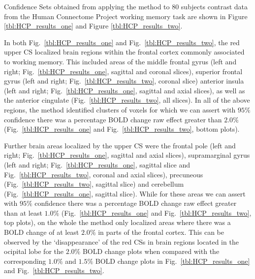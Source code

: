 Confidence Sets obtained from applying the method to 80 subjects contrast data from the Human Connectome Project working memory task are shown in Figure \ref{tbl:HCP_results_one} and Figure \ref{tbl:HCP_results_two}.

In both Fig.\ \ref{tbl:HCP_results_one} and Fig.\ \ref{tbl:HCP_results_two}, the red upper CS localized brain regions within the frontal cortex commonly associated to working memory. This included areas of the middle frontal gyrus (left and right; Fig.\ \ref{tbl:HCP_results_one}, sagittal and coronal slices), superior frontal gyrus (left and right; Fig.\ \ref{tbl:HCP_results_two}, coronal slice) anterior insula (left and right; Fig.\ \ref{tbl:HCP_results_one}, sagittal and axial slices), as well as the anterior cingulate (Fig.\ \ref{tbl:HCP_results_two}, all slices). In all of the above regions, the method identified clusters of voxels for which we can assert with $95\%$ confidence there was a percentage BOLD change raw effect greater than $2.0\%$ (Fig.\ \ref{tbl:HCP_results_one} and Fig.\ \ref{tbl:HCP_results_two}, bottom plots). 

Further brain areas localized by the upper CS were the frontal pole (left and right; Fig.\ \ref{tbl:HCP_results_one}, sagittal and axial slices), supramarginal gyrus (left and right; Fig.\ \ref{tbl:HCP_results_one}, sagittal slice and Fig.\ \ref{tbl:HCP_results_two}, coronal and axial slices), precuneous (Fig.\ \ref{tbl:HCP_results_two}, sagittal slice) and cerebellum (Fig.\ \ref{tbl:HCP_results_one}, sagittal slice). While for these areas we can assert with $95\%$ confidence there was a percentage BOLD change raw effect greater than at least $1.0\%$ (Fig.\ \ref{tbl:HCP_results_one} and Fig.\ \ref{tbl:HCP_results_two}, top plots), on the whole the method only localized areas where there was a BOLD change of at least $2.0\%$ in parts of the frontal cortex. This can be observed by the `disappearance' of the red CSs in brain regions located in the ocipital lobe for the $2.0\%$ BOLD change plots when compared with the corresponding $1.0\%$ and $1.5\%$ BOLD change plots in Fig.\ \ref{tbl:HCP_results_one} and Fig.\ \ref{tbl:HCP_results_two}. 

